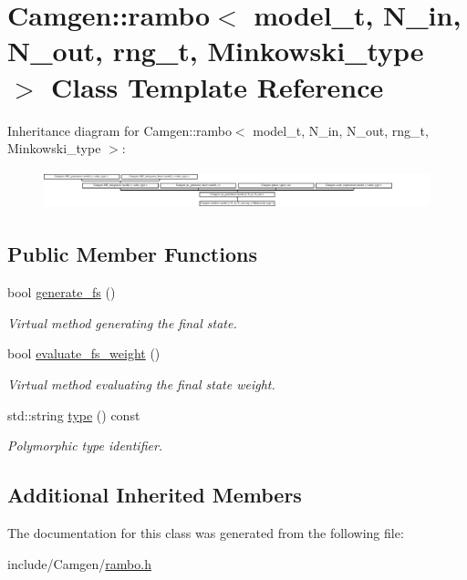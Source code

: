 \hypertarget{a00469}{}\section{Camgen\+:\+:rambo$<$ model\+\_\+t, N\+\_\+in, N\+\_\+out, rng\+\_\+t, Minkowski\+\_\+type $>$ Class Template Reference}
\label{a00469}
Inheritance diagram for Camgen\+:\+:rambo$<$ model\+\_\+t, N\+\_\+in, N\+\_\+out, rng\+\_\+t, Minkowski\+\_\+type $>$\+:\begin{figure}[H]
\begin{center}
\leavevmode
\includegraphics[height=1.157623cm]{a00469}
\end{center}
\end{figure}
\subsection*{Public Member Functions}
\begin{DoxyCompactItemize}
\item 
\hypertarget{a00469_a0fcb472d039e483f77b58305b4bd4986}{}bool \hyperlink{a00469_a0fcb472d039e483f77b58305b4bd4986}{generate\+\_\+fs} ()\label{a00469_a0fcb472d039e483f77b58305b4bd4986}

\begin{DoxyCompactList}\small\item\em Virtual method generating the final state. \end{DoxyCompactList}\item 
\hypertarget{a00469_ae6e268820d2de91b8282723f3a03eb91}{}bool \hyperlink{a00469_ae6e268820d2de91b8282723f3a03eb91}{evaluate\+\_\+fs\+\_\+weight} ()\label{a00469_ae6e268820d2de91b8282723f3a03eb91}

\begin{DoxyCompactList}\small\item\em Virtual method evaluating the final state weight. \end{DoxyCompactList}\item 
\hypertarget{a00469_a8badd899251b3c0b138354e50e755aad}{}std\+::string \hyperlink{a00469_a8badd899251b3c0b138354e50e755aad}{type} () const \label{a00469_a8badd899251b3c0b138354e50e755aad}

\begin{DoxyCompactList}\small\item\em Polymorphic type identifier. \end{DoxyCompactList}\end{DoxyCompactItemize}
\subsection*{Additional Inherited Members}


The documentation for this class was generated from the following file\+:\begin{DoxyCompactItemize}
\item 
include/\+Camgen/\hyperlink{a00756}{rambo.\+h}\end{DoxyCompactItemize}
